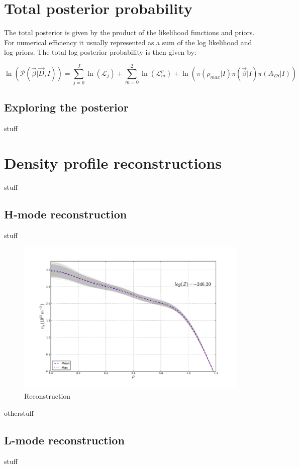 \documentclass[12pt]{article}
\numberwithin{equation}{section}
\begin{document}
\section{Total posterior probability}
The total posterior is given by the product of the likelihood functions and priors. For numerical efficiency it usually represented as a sum of the log likelihood and log priors. The total log posterior probability is then given by:

\begin{equation} \label{eq:tot_post} 
\ln(\mathcal{P}(\vec{\beta}|\vec{D},I)) = \sum \limits_{j=0}^{J} \ln(\mathcal{L}_j) + \sum \limits_{m=0}^{2} \ln(\mathcal{L}^p_m)  + \ln(\pi(\rho_{max}|I)\pi(\vec{\beta}|I)\pi(A_{TS}|I))
\end{equation}
\subsection{Exploring the posterior}
stuff
\section{Density profile reconstructions}
stuff
\subsection{H-mode reconstruction}
stuff
\begin{figure}[ht]
	\centering
	\includegraphics[width=12cm,keepaspectratio=true]{figures/bfit146102_00505_all5}
	\vspace{-30pt}
	\caption{Reconstruction}
\end{figure}
otherstuff
\subsection{L-mode reconstruction}
stuff
\end{document}
